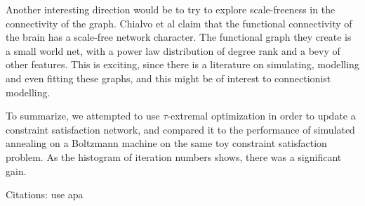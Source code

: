 \documentclass[12pt]{article}
\begin{document}
Another interesting direction would be to try to explore scale-freeness in the connectivity of the graph. Chialvo et al claim that the functional connectivity of the brain has a scale-free network character. The functional graph they create is a small world net, with a power law distribution of degree rank and a bevy of other features. This is exciting, since there is a literature on simulating, modelling and even fitting these graphs, and this might be of interest to connectionist modelling.

To summarize, we attempted to use $\tau$-extremal optimization in order to update a constraint satisfaction network, and compared it to the performance of simulated annealing on a Boltzmann machine on the same toy constraint satisfaction problem. As the histogram of iteration numbers shows, there was a significant gain.

\begin{thebibliography}[99]
    Citations:   use apa
\end{thebibliography}
\end{document}

